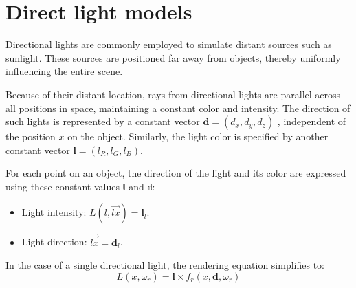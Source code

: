 \section{Direct light models}

Directional lights are commonly employed to simulate distant sources such as sunlight. 
These sources are positioned far away from objects, thereby uniformly influencing the entire scene.

Because of their distant location, rays from directional lights are parallel across all positions in space, maintaining a constant color and intensity.
The direction of such lights is represented by a constant vector $\textbf{d}=(d_{x},d_{y},d_{z})$ , independent of the position $x$ on the object.
Similarly, the light color is specified by another constant vector $\textbf{l}=(l_{R},l_{G},l_{B})$. 

For each point on an object, the direction of the light and its color are expressed using these constant values $\mathbb{l}$ and $\mathbb{d}$: 
\begin{itemize}
    \item Light intensity: $L(l,\overrightarrow{lx})=\textbf{l}_l$. 
    \item Light direction: $\overrightarrow{lx}=\textbf{d}_l$.
\end{itemize}
In the case of a single directional light, the rendering equation simplifies to:
\[L(x,\omega_r)=\textbf{l}\times f_r(x,\textbf{d},\omega_r)\]
